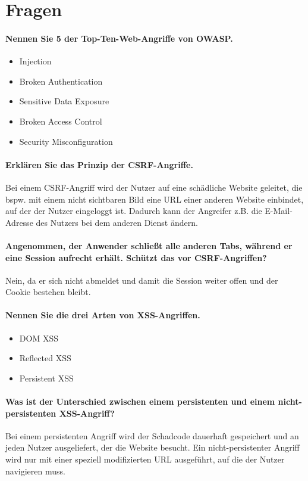 \documentclass[a4paper, 11pt, accentcolor = tud3b]{tudreport}
\begin{document}
        \section{Fragen} %
			\paragraph{Nennen Sie 5 der Top-Ten-Web-Angriffe von OWASP.}
			\begin{itemize}
				\item Injection
				\item Broken Authentication
				\item Sensitive Data Exposure
				\item Broken Access Control
				\item Security Misconfiguration
			\end{itemize}
			
			\paragraph{Erklären Sie das Prinzip der CSRF-Angriffe.}
			Bei einem CSRF-Angriff wird der Nutzer auf eine schädliche Website geleitet, die bspw. mit einem nicht sichtbaren Bild eine URL einer anderen Website einbindet, auf der der Nutzer eingeloggt ist. Dadurch kann der Angreifer z.B. die E-Mail-Adresse des Nutzers bei dem anderen Dienst ändern.
			
			\paragraph{Angenommen, der Anwender schließt alle anderen Tabs, während er eine Session aufrecht erhält. Schützt das vor CSRF-Angriffen?}
			Nein, da er sich nicht abmeldet und damit die Session weiter offen und der Cookie bestehen bleibt.
			
			\paragraph{Nennen Sie die drei Arten von XSS-Angriffen.}
			\begin{itemize}
				\item DOM XSS
				\item Reflected XSS
				\item Persistent XSS
			\end{itemize}
			
			\paragraph{Was ist der Unterschied zwischen einem persistenten und einem nicht-persistenten XSS-Angriff?}
			Bei einem persistenten Angriff wird der Schadcode dauerhaft gespeichert und an jeden Nutzer ausgeliefert, der die Website besucht. Ein nicht-persistenter Angriff wird nur mit einer speziell modifizierten URL ausgeführt, auf die der Nutzer navigieren muss.
			
\end{document}
